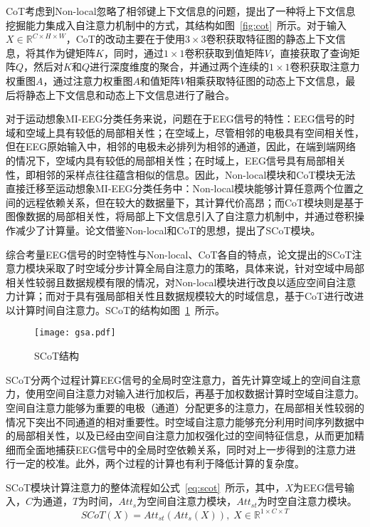 CoT考虑到Non-local忽略了相邻键上下文信息的问题，提出了一种将上下文信息挖掘能力集成入自注意力机制中的方式，其结构如图~\ref{fig:cot}~所示。对于输入\(X \in \mathbb{R}^{C \times H \times W}\)，CoT的改动主要在于使用\(3\times3\)卷积获取特征图的静态上下文信息，将其作为键矩阵\(K\)，同时，通过\(1\times1\)卷积获取到值矩阵\(V\)，直接获取了查询矩阵\(Q\)，然后对\(K\)和\(Q\)进行深度维度的聚合，并通过两个连续的\(1\times1\)卷积获取注意力权重图\(A\)，通过注意力权重图\(A\)和值矩阵\(V\)相乘获取特征图的动态上下文信息，最后将静态上下文信息和动态上下文信息进行了融合。

对于运动想象MI-EEG分类任务来说，问题在于EEG信号的特性：EEG信号的时域和空域上具有较低的局部相关性；在空域上，尽管相邻的电极具有空间相关性，但在EEG原始输入中，相邻的电极未必排列为相邻的通道，因此，在端到端网络的情况下，空域内具有较低的局部相关性；在时域上，EEG信号具有局部相关性，即相邻的采样点往往蕴含相似的信息。因此，Non-local模块和CoT模块无法直接迁移至运动想象MI-EEG分类任务中：Non-local模块能够计算任意两个位置之间的远程依赖关系，但在较大的数据量下，其计算代价高昂；而CoT模块则是基于图像数据的局部相关性，将局部上下文信息引入了自注意力机制中，并通过卷积操作减少了计算量。论文借鉴Non-local和CoT的思想，提出了SCoT模块。

综合考量EEG信号的时空特性与Non-local、CoT各自的特点，论文提出的SCoT注意力模块采取了时空域分步计算全局自注意力的策略，具体来说，针对空域中局部相关性较弱且数据规模有限的情况，对Non-local模块进行改良以适应空间自注意力计算；而对于具有强局部相关性且数据规模较大的时域信息，基于CoT进行改进以计算时间自注意力。SCoT的结构如图~\ref{fig:gsa}~所示。
\begin{figure}
    \centering
    \texttt{[image: gsa.pdf]}
    \caption{SCoT结构}
    \label{fig:gsa}
\end{figure}

SCoT分两个过程计算EEG信号的全局时空注意力，首先计算空域上的空间自注意力，使用空间自注意力对输入进行加权后，再基于加权数据计算时空域自注意力。空间自注意力能够为重要的电极（通道）分配更多的注意力，在局部相关性较弱的情况下突出不同通道的相对重要性。时空域自注意力能够充分利用时间序列数据中的局部相关性，以及已经由空间自注意力加权强化过的空间特征信息，从而更加精细而全面地捕获EEG信号中的全局时空依赖关系，同时对上一步得到的注意力进行一定的校准。此外，两个过程的计算也有利于降低计算的复杂度。

SCoT模块计算注意力的整体流程如公式~\ref{eq:scot}~所示，其中，\(X\)为EEG信号输入，\(C\)为通道，\(T\)为时间，\(Att_s\)为空间自注意力模块，\(Att_{st}\)为时空自注意力模块。
\begin{equation}
    SCoT(X)=Att_{st}(Att_s(X)), \; X \in \mathbb{R}^{1 \times C \times T}
    \label{eq:scot}
\end{equation}

